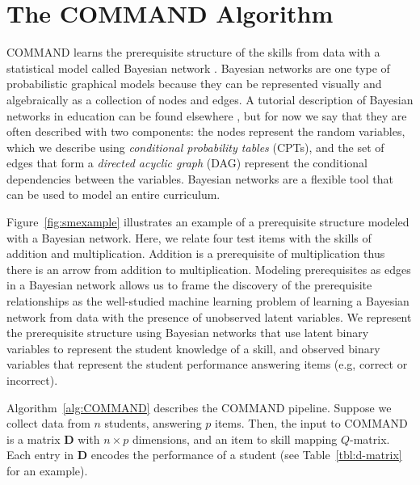 \documentclass{edm_template}
\begin{document}
\section{The COMMAND Algorithm}
\label{sec:pre_pipeline}
COMMAND learns the prerequisite structure of the skills from data with a statistical model called Bayesian network \cite{pearl1988probabilistic,spirtes2001causation}.
Bayesian networks are one type of probabilistic graphical models because they can be represented visually and algebraically as a collection of nodes and edges.
A tutorial description of Bayesian networks in education can be found elsewhere \cite{almond2015bayesian}, 
but for now we say that they are often described with two components: 
the  nodes represent the random variables, which we describe using \textit{conditional probability tables} (CPTs),
and the set of edges that form a \textit{directed acyclic graph} (DAG) represent the conditional dependencies between the variables.
Bayesian networks are a flexible tool that can be used to model an entire curriculum.

Figure~\ref{fig:smexample} illustrates an example of a prerequisite structure modeled with a Bayesian network.
Here, we relate four test items with the skills of addition and multiplication.
Addition is a prerequisite of multiplication thus there is an arrow from addition to multiplication.
Modeling prerequisites as edges in a Bayesian network allows us to frame the discovery of the prerequisite relationships as the well-studied machine learning problem of
learning a Bayesian network from data with the presence of unobserved latent variables.
We represent the prerequisite structure using Bayesian networks that use latent binary variables to represent the student knowledge of a skill, 
and observed binary variables that represent the student performance answering items (e.g, correct or incorrect).



Algorithm~\ref{alg:COMMAND} describes the COMMAND pipeline.
Suppose we collect data from  $n$ students, answering $p$ items.
Then, the input to COMMAND is a matrix $\mathbf{D}$ with $n \times p$ dimensions, and an item to skill mapping $Q$-matrix.
Each entry in $\mathbf{D}$ encodes the performance of a student (see Table~\ref{tbl:d-matrix} for an example).
\end{document}
